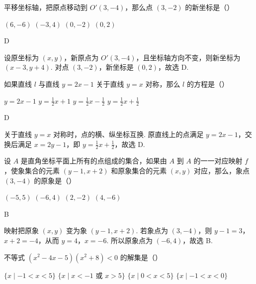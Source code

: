 \begin{problem}
平移坐标轴，把原点移动到 \(O'(3,-4)\)，那么点 \((3,-2)\) 的新坐标是（\quad）

\choices
    {\((6,-6)\)}
    {\((-3,4)\)}
    {\((0,-2)\)}
    {\((0,2)\)}
\end{problem}

\begin{answer}
D
\end{answer}

\begin{solution}
设原坐标为 \((x,y)\)，新原点为 \(O'(3,-4)\)，且坐标轴方向不变，则新坐标为 \((x-3,y+4)\). 对点 \((3,-2)\)，新坐标是 \((0,2)\)，故选 D.
\end{solution}

\begin{problem}
如果直线 \(l\) 与直线 \(y=2x-1\) 关于直线 \(y=x\) 对称，那么 \(l\) 的方程是（\quad）

\choices
    {\(y=2x-1\)}
    {\(y=\frac{1}{2}x+1\)}
    {\(y=\frac{1}{2}x-\frac{1}{2}\)}
    {\(y=\frac{1}{2}x+\frac{1}{2}\)}
\end{problem}

\begin{answer}
D
\end{answer}

\begin{solution}
关于直线 \(y=x\) 对称时，点的横、纵坐标互换. 原直线上的点满足 \(y=2x-1\)，交换后满足 \(x=2y-1\)，即 \(y=\frac12x+\frac12\)，故选 D.
\end{solution}

\begin{problem}
设 \(A\) 是直角坐标平面上所有的点组成的集合，如果由 \(A\) 到 \(A\) 的一一对应映射 \(f\)，使象集合的元素 \((y-1,x+2)\) 和原象集合的元素 \((x,y)\) 对应，那么，象点 \((3,-4)\) 的原象是（\quad）

\choices
    {\((-5,5)\)}
    {\((-6,4)\)}
    {\((2,-2)\)}
    {\((4,-6)\)}
\end{problem}

\begin{answer}
B
\end{answer}

\begin{solution}
映射把原象 \((x,y)\) 变为象 \((y-1,x+2)\). 若象点为 \((3,-4)\)，则
\(y-1=3\)，\(x+2=-4\)，从而 \(y=4\)，\(x=-6\). 所以原象点为 \((-6,4)\)，故选 B.
\end{solution}

\begin{problem}
不等式 \((x^2-4x-5)(x^2+8)<0\) 的解集是（\quad）

\choices
    {\(\{x\mid -1<x<5\}\)}
    {\(\{x\mid x<-1\text{\ 或\ }x>5\}\)}
    {\(\{x\mid 0<x<5\}\)}
    {\(\{x\mid -1<x<0\}\)}
\end{problem}

